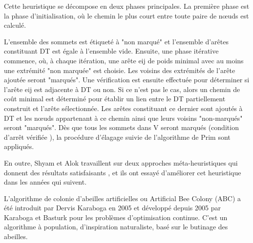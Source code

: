 Cette heuristique se décompose en deux phases principales. La première phase est la phase d’initialisation, où le chemin le plus court entre toute paire de nœuds est calculé.

L’ensemble des sommets est étiqueté à "non marqué" et l’ensemble d’arêtes constituant DT est égale à l’ensemble vide. Ensuite, une phase itérative commence, où, à chaque itération, une arête eij de poids minimal avec au moins une extrémité "non marquée" est choisie. Les voisins des extrémités de l’arête ajoutée seront "marqués". Une vérification est ensuite effectuée pour déterminer si l’arête eij est adjacente à DT ou non. Si ce n’est pas le cas, alors un chemin de coût minimal est déterminé pour établir un lien entre le DT partiellement construit et l’arête sélectionnée. Les arêtes constituant ce dernier sont ajoutés à DT et les nœuds appartenant à ce chemin ainsi que leurs voisins "non-marqués" seront "marqués". Dès que tous les sommets dans V seront marqués (condition d’arrêt vérifiée ), la procédure d’élagage suivie de l’algorithme de Prim  sont appliqués.   
    
En outre, Shyam et Alok travaillent sur deux approches méta-heuristiques qui donnent des résultats satisfaisants , et ils ont essayé d’améliorer cet heuristique dans les années qui suivent.

L’algorithme de colonie d’abeilles artificielles ou Artificial Bee Colony (ABC) a été introduit par Dervis Karaboga en 2005 \cite{karaboga2005idea} et développé depuis 2005 par Karaboga et Basturk \cite{karaboga2008performance} pour les problèmes d’optimisation continue. C’est un algorithme à population, d’inspiration naturaliste, basé sur le butinage des abeilles.

